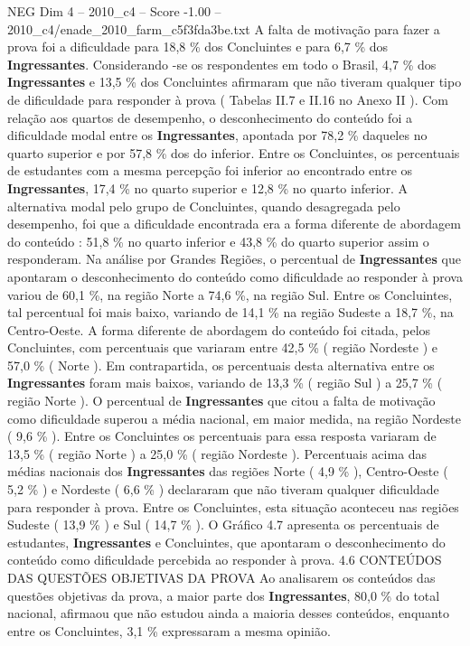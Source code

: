 \begin{textsample}{NEG Dim 4 – 2010\_c4 – Score -1.00 – 2010\_c4/enade\_2010\_farm\_c5f3fda3be.txt}
A falta de motivação para fazer a prova foi a dificuldade para 18,8 \% dos Concluintes e para 6,7 \% dos \textbf{Ingressantes}.
Considerando -se os respondentes em todo o Brasil, 4,7 \% dos \textbf{Ingressantes} e 13,5 \% dos Concluintes afirmaram que não tiveram qualquer tipo de dificuldade para responder à prova ( Tabelas II.7 e II.16 no Anexo II ).
Com relação aos quartos de desempenho, o desconhecimento do conteúdo foi a dificuldade modal entre os \textbf{Ingressantes}, apontada por 78,2 \% daqueles no quarto superior e por 57,8 \% dos do inferior.
Entre os Concluintes, os percentuais de estudantes com a mesma percepção foi inferior ao encontrado entre os \textbf{Ingressantes}, 17,4 \% no quarto superior e 12,8 \% no quarto inferior.
A alternativa modal pelo grupo de Concluintes, quando desagregada pelo desempenho, foi que a dificuldade encontrada era a forma diferente de abordagem do conteúdo : 51,8 \% no quarto inferior e 43,8 \% do quarto superior assim o responderam.
Na análise por Grandes Regiões, o percentual de \textbf{Ingressantes} que apontaram o desconhecimento do conteúdo como dificuldade ao responder à prova variou de 60,1 \%, na região Norte a 74,6 \%, na região Sul.
Entre os Concluintes, tal percentual foi mais baixo, variando de 14,1 \% na região Sudeste a 18,7 \%, na Centro-Oeste.
A forma diferente de abordagem do conteúdo foi citada, pelos Concluintes, com percentuais que variaram entre 42,5 \% ( região Nordeste ) e 57,0 \% ( Norte ).
Em contrapartida, os percentuais desta alternativa entre os \textbf{Ingressantes} foram mais baixos, variando de 13,3 \% ( região Sul ) a 25,7 \% ( região Norte ).
O percentual de \textbf{Ingressantes} que citou a falta de motivação como dificuldade superou a média nacional, em maior medida, na região Nordeste ( 9,6 \% ).
Entre os Concluintes os percentuais para essa resposta variaram de 13,5 \% ( região Norte ) a 25,0 \% ( região Nordeste ).
Percentuais acima das médias nacionais dos \textbf{Ingressantes} das regiões Norte ( 4,9 \% ), Centro-Oeste ( 5,2 \% ) e Nordeste ( 6,6 \% ) declararam que não tiveram qualquer dificuldade para responder à prova.
Entre os Concluintes, esta situação aconteceu nas regiões Sudeste ( 13,9 \% ) e Sul ( 14,7 \% ).
O Gráfico 4.7 apresenta os percentuais de estudantes, \textbf{Ingressantes} e Concluintes, que apontaram o desconhecimento do conteúdo como dificuldade percebida ao responder à prova. 4.6 CONTEÚDOS DAS QUESTÕES OBJETIVAS DA PROVA Ao analisarem os conteúdos das questões objetivas da prova, a maior parte dos \textbf{Ingressantes}, 80,0 \% do total nacional, afirmaou que não estudou ainda a maioria desses conteúdos, enquanto entre os Concluintes, 3,1 \% expressaram a mesma opinião.

\end{textsample}
